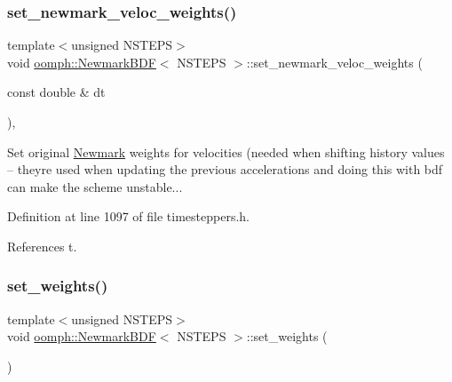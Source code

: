 \mbox{\label{classoomph_1_1NewmarkBDF_adbe18fc7de8512a7d335832515ed34bb}} 
\subsubsection{\texorpdfstring{set\+\_\+newmark\+\_\+veloc\+\_\+weights()}{set\_newmark\_veloc\_weights()}}
{\footnotesize\ttfamily template$<$unsigned N\+S\+T\+E\+PS$>$ \\
void \hyperlink{classoomph_1_1NewmarkBDF}{oomph\+::\+Newmark\+B\+DF}$<$ N\+S\+T\+E\+PS $>$\+::set\+\_\+newmark\+\_\+veloc\+\_\+weights (\begin{DoxyParamCaption}\item[{const double \&}]{dt }\end{DoxyParamCaption})\hspace{0.3cm}{\ttfamily [inline]}, {\ttfamily [private]}}



Set original \hyperlink{classoomph_1_1Newmark}{Newmark} weights for velocities (needed when shifting history values -- they\textquotesingle{}re used when updating the previous accelerations and doing this with bdf can make the scheme unstable... 



Definition at line 1097 of file timesteppers.\+h.



References t.

\mbox{\label{classoomph_1_1NewmarkBDF_a338055c11a633d2d22e5fd3b378910b2}} 
\subsubsection{\texorpdfstring{set\+\_\+weights()}{set\_weights()}\hspace{0.1cm}{\footnotesize\ttfamily [1/4]}}
{\footnotesize\ttfamily template$<$unsigned N\+S\+T\+E\+PS$>$ \\
void \hyperlink{classoomph_1_1NewmarkBDF}{oomph\+::\+Newmark\+B\+DF}$<$ N\+S\+T\+E\+PS $>$\+::set\+\_\+weights (\begin{DoxyParamCaption}{ }\end{DoxyParamCaption})\hspace{0.3cm}{\ttfamily [virtual]}}



